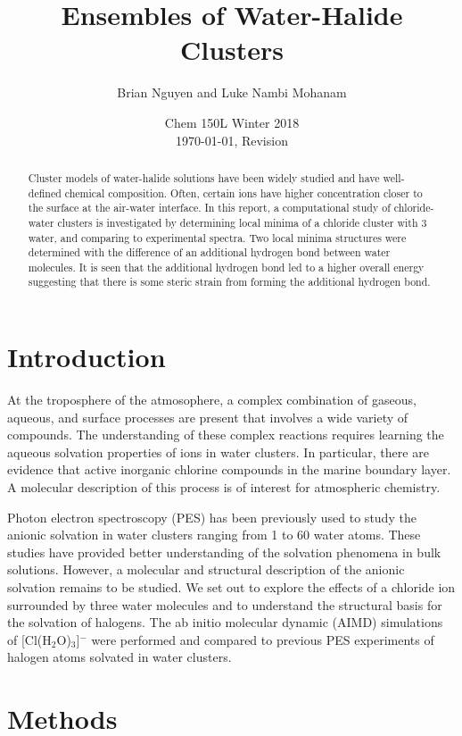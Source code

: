 \documentclass[11pt]{article}
\title{\textbf{Ensembles of Water-Halide Clusters}}
\author{Brian Nguyen and Luke Nambi Mohanam}
\date{Chem 150L Winter 2018 \\ \today, Revision \Revision}
\begin{document}
\maketitle

\begin{abstract}
  Cluster models of water-halide solutions have been widely studied
  and have well-defined chemical composition. Often, certain ions
  have higher concentration
  closer to the surface at the air-water interface. In this report,
  a computational study of chloride-water clusters is investigated by
  determining local minima of a chloride cluster with 3 water,
  and comparing to experimental spectra.
  Two local minima structures were determined 
  with the difference of an
  additional hydrogen bond between water molecules. It is seen
  that the additional hydrogen bond led to a higher overall energy
  suggesting that there is some steric strain from forming the additional
  hydrogen bond.
\end{abstract}

\section{Introduction}

At the troposphere of the atmosophere, a complex combination of
gaseous, aqueous, and surface processes are present that involves
a wide variety of compounds\cite{doi:10.1021/cr020653t}.
The understanding of these complex
reactions requires learning the aqueous solvation properties of
ions in water clusters. In particular, there are evidence that
active inorganic chlorine compounds in the marine boundary
layer.\cite{doi:10.1021/cr0403741}
A molecular description of this process is of interest
for atmospheric chemistry.

Photon electron spectroscopy (PES) has been previously used to
study the anionic solvation in water clusters ranging from
1 to 60 water atoms\cite{doi:10.1063/1.467965}. These studies have provided
better understanding of the solvation phenomena in bulk
solutions. However, a molecular and structural
description of the anionic solvation remains to be studied. 
We set out to explore the effects of a chloride ion surrounded
by three  water molecules and to understand the structural basis
for the solvation of halogens. The ab initio molecular dynamic
(AIMD) simulations of [Cl(H$_2$O)$_3$]$^-$  were performed and
compared to previous PES experiments of halogen atoms solvated
in water clusters.

\section{Methods}
\end{document}
